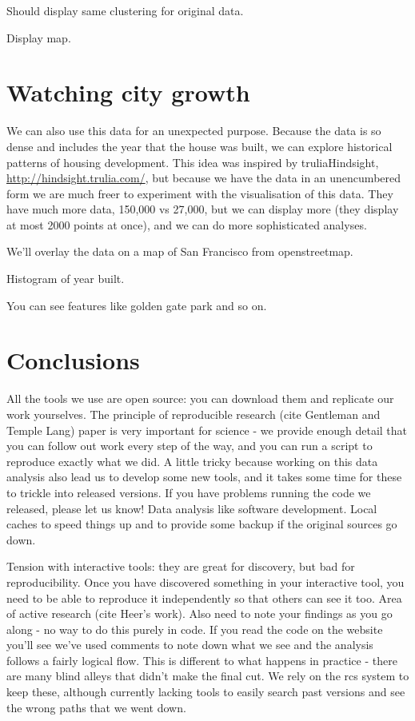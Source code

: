 \documentclass[oneside]{article}
\begin{document}
Should display same clustering for original data.

Display map.

\section{Watching city growth}

We can also use this data for an unexpected purpose.  Because the data is so dense and includes the year that the house was built, we can explore historical patterns of housing development.  This idea was inspired by truliaHindsight, \url{http://hindsight.trulia.com/}, but because we have the data in an unencumbered form we are much freer to experiment with the visualisation of this data.  They have much more data, 150,000 vs 27,000, but we can display more (they display at most 2000 points at once), and we can do more sophisticated analyses.

We'll overlay the data on a map of San Francisco from openstreetmap.

Histogram of year built.

You can see features like golden gate park and so on.

\section{Conclusions}

All the tools we use are open source: you can download them and replicate our work yourselves.  The principle of reproducible research (cite Gentleman and Temple Lang) paper is very important for science - we provide enough detail that you can follow out work every step of the way, and you can run a script to reproduce exactly what we did.  A little tricky because working on this data analysis also lead us to develop some new tools, and it takes some time for these to trickle into released versions.  If you have problems running the code we released, please let us know!  Data analysis like software development.  Local caches to speed things up and to provide some backup if the original sources go down.

Tension with interactive tools: they are great for discovery, but bad for reproducibility.  Once you have discovered something in your interactive tool, you need to be able to reproduce it independently so that others can see it too.  Area of active research (cite Heer's work).  Also need to note your findings as you go along - no way to do this purely in code.  If you read the code on the website you'll see we've used comments to note down what we see and the analysis follows a fairly logical flow.  This is different to what happens in practice - there are many blind alleys that didn't make the final cut.  We rely on the rcs system to keep these, although currently lacking tools to easily search past versions and see the wrong paths that we went down.
\end{document}
